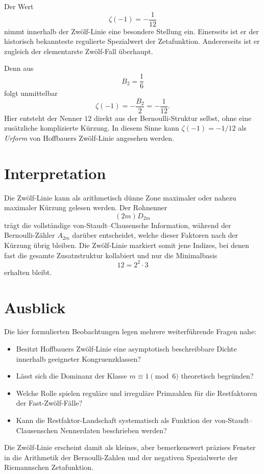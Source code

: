 \documentclass[11pt,a4paper]{article}
\theoremstyle{definition}
\theoremstyle{plain}
\theoremstyle{remark}
\begin{document}
	Der Wert
	\[
	\zeta(-1)=-\frac{1}{12}
	\]
	nimmt innerhalb der Zwölf-Linie eine besondere Stellung ein. Einerseits ist er der historisch bekannteste regulierte Spezialwert der Zetafunktion. Andererseits ist er zugleich der elementarste Zwölf-Fall überhaupt.
	
	Denn aus
	\[
	B_2=\frac16
	\]
	folgt unmittelbar
	\[
	\zeta(-1)=-\frac{B_2}{2}=-\frac{1}{12}.
	\]
	Hier entsteht der Nenner $12$ direkt aus der Bernoulli-Struktur selbst, ohne eine zusätzliche komplizierte Kürzung. In diesem Sinne kann $\zeta(-1)=-1/12$ als \emph{Urform} von Hoffbauers Zwölf-Linie angesehen werden.
	
	\section{Interpretation}
	
	Die Zwölf-Linie kann als arithmetisch dünne Zone maximaler oder nahezu maximaler Kürzung gelesen werden. Der Rohnenner
	\[
	(2m)D_{2m}
	\]
	trägt die vollständige von-Staudt--Clausensche Information, während der Bernoulli-Zähler $A_{2m}$ darüber entscheidet, welche dieser Faktoren nach der Kürzung übrig bleiben. Die Zwölf-Linie markiert somit jene Indizes, bei denen fast die gesamte Zusatzstruktur kollabiert und nur die Minimalbasis
	\[
	12=2^2\cdot 3
	\]
	erhalten bleibt.
	
	\section{Ausblick}
	
	Die hier formulierten Beobachtungen legen mehrere weiterführende Fragen nahe:
	\begin{itemize}
		\item Besitzt Hoffbauers Zwölf-Linie eine asymptotisch beschreibbare Dichte innerhalb geeigneter Kongruenzklassen?
		\item Lässt sich die Dominanz der Klasse $m\equiv 1\pmod 6$ theoretisch begründen?
		\item Welche Rolle spielen reguläre und irreguläre Primzahlen für die Restfaktoren der Fast-Zwölf-Fälle?
		\item Kann die Restfaktor-Landschaft systematisch als Funktion der von-Staudt--Clausenschen Nennerdaten beschrieben werden?
	\end{itemize}
	
	Die Zwölf-Linie erscheint damit als kleines, aber bemerkenswert präzises Fenster in die Arithmetik der Bernoulli-Zahlen und der negativen Spezialwerte der Riemannschen Zetafunktion.
	
\end{document}
